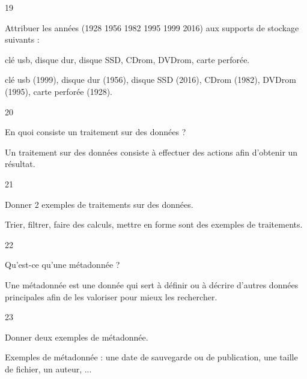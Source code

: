 \begin{taggedblock}{19}
\begin{exoq}
Attribuer les années (1928 1956 1982 1995 1999 2016) aux supports de stockage suivants :

clé usb, disque dur, disque SSD, CDrom, DVDrom, carte perforée.
\end{exoq} 
\begin{exor}
clé usb (1999), disque dur (1956), disque SSD (2016), CDrom (1982), DVDrom (1995), carte perforée (1928). \bqr
\end{exor} 
\end{taggedblock}

\begin{taggedblock}{20}
\begin{exoq}
En quoi consiste un traitement sur des données ?
\end{exoq} 
\begin{exor}
Un traitement sur des données consiste à effectuer des actions afin d'obtenir un résultat. \bqr
\end{exor} 
\end{taggedblock}

\begin{taggedblock}{21}
\begin{exoq}
Donner 2 exemples de traitements sur des données.
\end{exoq} 
\begin{exor}
Trier, filtrer, faire des calculs, mettre en forme sont des exemples de traitements. \bqr
\end{exor} 
\end{taggedblock}

\begin{taggedblock}{22}
\begin{exoq}
Qu'est-ce qu'une métadonnée ?
\end{exoq} 
\begin{exor}
Une métadonnée est une donnée qui sert à définir ou à décrire d'autres données principales afin de les valoriser pour mieux les rechercher. \bqr
\end{exor} 
\end{taggedblock}

\begin{taggedblock}{23}
\begin{exoq}
Donner deux exemples de métadonnée.
\end{exoq} 
\begin{exor}
Exemples de métadonnée : une date de sauvegarde ou de publication, une taille de fichier, un auteur, ... \bqr
\end{exor} 
\end{taggedblock}

